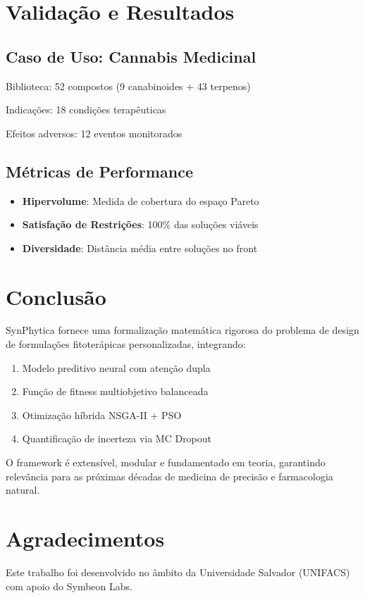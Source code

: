 \documentclass[12pt, a4paper]{article}
\begin{document}
\section{Validação e Resultados}

\subsection{Caso de Uso: Cannabis Medicinal}

Biblioteca: 52 compostos (9 canabinoides + 43 terpenos)

Indicações: 18 condições terapêuticas

Efeitos adversos: 12 eventos monitorados

\subsection{Métricas de Performance}

\begin{itemize}
    \item \textbf{Hipervolume}: Medida de cobertura do espaço Pareto
    \item \textbf{Satisfação de Restrições}: 100\% das soluções viáveis
    \item \textbf{Diversidade}: Distância média entre soluções no front
\end{itemize}

\section{Conclusão}

SynPhytica fornece uma formalização matemática rigorosa do problema de design de formulações fitoterápicas personalizadas, integrando:

\begin{enumerate}
    \item Modelo preditivo neural com atenção dupla
    \item Função de fitness multiobjetivo balanceada
    \item Otimização híbrida NSGA-II + PSO
    \item Quantificação de incerteza via MC Dropout
\end{enumerate}

O framework é extensível, modular e fundamentado em teoria, garantindo relevância para as próximas décadas de medicina de precisão e farmacologia natural.

\section*{Agradecimentos}

Este trabalho foi desenvolvido no âmbito da Universidade Salvador (UNIFACS) com apoio do Symbeon Labs.



\end{document}
